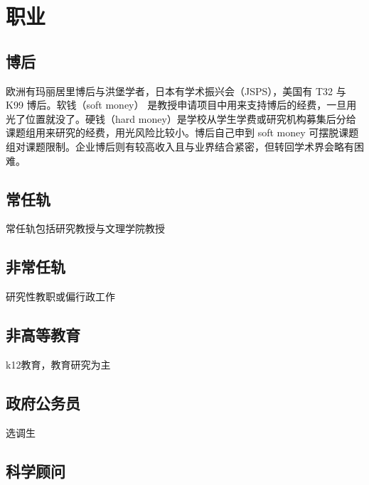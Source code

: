 \documentclass[]{tufte-book}
\begin{document}
\hypertarget{ux804cux4e1a}{%
\section{职业}\label{ux804cux4e1a}}

\hypertarget{ux535aux540e}{%
\subsection{博后}\label{ux535aux540e}}

欧洲有玛丽居里博后与洪堡学者，日本有学术振兴会（JSPS），美国有 T32 与 K99 博后。软钱（soft money） 是教授申请项目中用来支持博后的经费，一旦用光了位置就没了。硬钱（hard money）是学校从学生学费或研究机构募集后分给课题组用来研究的经费，用光风险比较小。博后自己申到 soft money 可摆脱课题组对课题限制。企业博后则有较高收入且与业界结合紧密，但转回学术界会略有困难。

\hypertarget{ux5e38ux4efbux8f68}{%
\subsection{常任轨}\label{ux5e38ux4efbux8f68}}

常任轨包括研究教授与文理学院教授

\hypertarget{ux975eux5e38ux4efbux8f68}{%
\subsection{非常任轨}\label{ux975eux5e38ux4efbux8f68}}

研究性教职或偏行政工作

\hypertarget{ux975eux9ad8ux7b49ux6559ux80b2}{%
\subsection{非高等教育}\label{ux975eux9ad8ux7b49ux6559ux80b2}}

k12教育，教育研究为主

\hypertarget{ux653fux5e9cux516cux52a1ux5458}{%
\subsection{政府公务员}\label{ux653fux5e9cux516cux52a1ux5458}}

选调生

\hypertarget{ux79d1ux5b66ux987eux95ee}{%
\subsection{科学顾问}\label{ux79d1ux5b66ux987eux95ee}}
\end{document}
